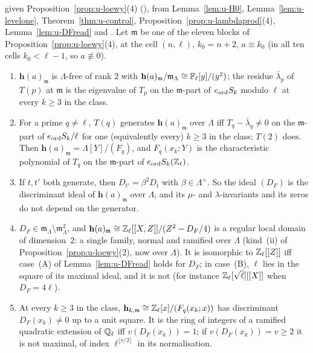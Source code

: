 \documentclass[11pt]{article}
\newcommand{\Iw}{\Lambda}                         %
\newcommand{\hcusp}{\mathbf{h}}                   %
\newcommand{\Zl}{\Z_\ell}
\newcommand{\Ql}{\Q_\ell}
\begin{document}
\begin{lemma}\label{lem:u-DF}
\PROVED{} given Proposition~\ref{prop:u-loewy}(4) (\COMP), from Lemma~\ref{lem:u-H0}, Lemma~\ref{lem:u-levelone}, Theorem~\ref{thm:u-control}, Proposition~\ref{prop:u-lambdaprod}(4), Lemma~\ref{lem:u-DFread} and
\STD{$q$-expansion duality $S_k(\Zl)_{\mathfrak m}\cong\Hom_{\Zl}(\hcusp_{k,\mathfrak m},\Zl)$}. Let $\mathfrak m$ be one of the eleven blocks of Proposition~\ref{prop:u-loewy}(4), at the cell
$(n,\ell)$, $k_0=n+2$, $a\equiv k_0$ (in all ten cells $k_0<\ell-1$, so $a\not\equiv0$).
\begin{enumerate}
\item $\hcusp(a)_{\mathfrak m}$ is $\Iw$-free of rank $2$ with $\hcusp(a)_{\mathfrak m}/\mathfrak m_\Iw\cong\Fl[y]/(y^{2})$; the residue $\bar\lambda_p$ of $T(p)$ at $\mathfrak m$ is the
  eigenvalue of $T_p$ on the $\mathfrak m$-part of $e_{\mathrm{ord}} S_k$ modulo $\ell$ at every $k\ge3$ in the class.
\item For a prime $q\ne\ell$, $T(q)$ generates $\hcusp(a)_{\mathfrak m}$ over $\Iw$ iff $T_q-\bar\lambda_q\ne0$ on the $\mathfrak m$-part of $e_{\mathrm{ord}} S_k/\ell$ for one (equivalently every)
  $k\ge3$ in the class; $T(2)$ does. Then $\hcusp(a)_{\mathfrak m}=\Iw[Y]/(F_q)$, and $F_q(x_k;Y)$ is the characteristic polynomial of $T_q$ on the $\mathfrak m$-part of $\eord S_k(\Zl)$.
\item If $t,t'$ both generate, then $D_{t'}=\beta^{2}D_t$ with $\beta\in\Iw^{\times}$. So the ideal $(D_F)$ is the discriminant ideal of $\hcusp(a)_{\mathfrak m}$ over $\Iw$, and its
  $\mu$- and $\lambda$-invariants and its zeros do not depend on the generator.
\item $D_F\in\mathfrak m_\Iw\setminus\mathfrak m_\Iw^{2}$, and $\hcusp(a)_{\mathfrak m}\cong\Zl[[X,Z]]/(Z^{2}-D_F/4)$ is a regular local domain of dimension~$2$: a single family, normal and
  ramified over $\Iw$ (kind~(ii) of Proposition~\ref{prop:u-loewy}(2), now over $\Iw$). It is isomorphic to $\Zl[[Z]]$ iff case~(A) of Lemma~\ref{lem:u-DFread} holds for $D_F$;
  in case~(B), $\ell$ lies in the square of its maximal ideal, and it is not (for instance $\Zl[\sqrt\ell][[X]]$ when $D_F=4\ell$).
\item At every $k\ge3$ in the class, $\hcusp_{k,\mathfrak m}\cong\Zl[x]/(F_q(x_k;x))$ has discriminant $D_F(x_k)\ne0$ up to a unit square. It is the ring of integers of a ramified
  quadratic extension of $\Ql$ iff $v(D_F(x_k))=1$; if $v(D_F(x_k))=v\ge2$ it is not maximal, of index $\ell^{\lfloor v/2\rfloor}$ in its normalisation.
\end{enumerate}
\end{lemma}
\end{document}
